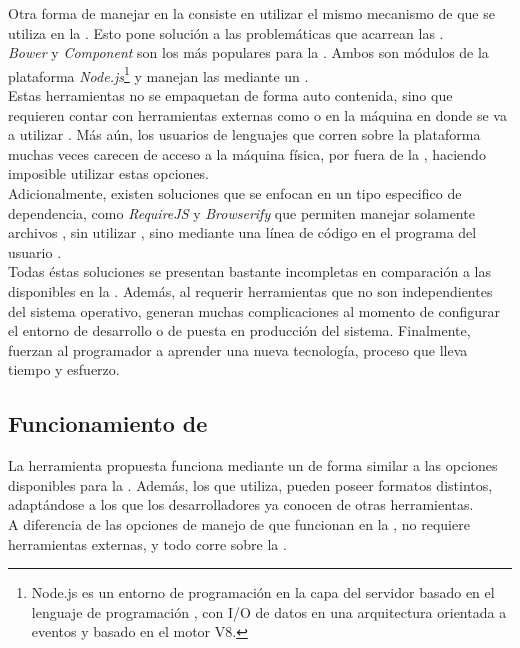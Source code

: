 Otra forma de manejar \dependencies en la \viewtier consiste en utilizar el 
mismo mecanismo de \depmgrs que se utiliza en la \logictier. Esto pone solución 
a las problemáticas que acarrean las \cdns.\\
\emph{Bower} y \emph{Component} son los \depmgrs más populares para la 
\viewtier. Ambos son módulos de la plataforma \emph{Node.js}\footnote{
	Node.js es un entorno de programación en la capa del servidor basado en el
	lenguaje de programación \js, con I/O de datos en una arquitectura 
	orientada a eventos y basado en el motor \js V8.
} y manejan las \dependencies mediante un \conffile.\\
Estas herramientas no se empaquetan de forma auto contenida, sino que requieren
contar con herramientas externas como \git o \svn en la máquina en donde se va a
utilizar . Más aún, los usuarios de lenguajes que corren 
sobre la plataforma \java muchas veces carecen de acceso a la máquina física, 
por fuera de la \jvm, haciendo imposible utilizar estas opciones.\\
Adicionalmente, existen soluciones que se enfocan en un tipo especifico de 
dependencia, como \emph{RequireJS} y \emph{Browserify} que permiten manejar 
solamente archivos \js, sin utilizar \conffiles, sino mediante una 
línea de código en el programa del usuario .\\
Todas éstas soluciones se presentan bastante incompletas en comparación a las
disponibles en la \viewtier. Además, al requerir herramientas que no son
independientes del sistema operativo, generan muchas complicaciones al momento
de configurar el entorno de desarrollo o de puesta en producción del sistema.
Finalmente, fuerzan al programador a aprender una nueva tecnología, proceso
que lleva tiempo y esfuerzo.

\subsection{Funcionamiento de \fronttier}
\label{subsec:depmgmnt:proposal}

La herramienta propuesta funciona mediante un \conffile de forma similar a las
opciones disponibles para la \logictier. Además, los \conffile que utiliza, 
pueden poseer formatos distintos, adaptándose a los que los desarrolladores ya 
conocen de otras herramientas.\\
A diferencia de las opciones de manejo de \dependencies que funcionan en la
\viewtier, \fronttier no requiere herramientas externas, y todo corre sobre la \jvm.